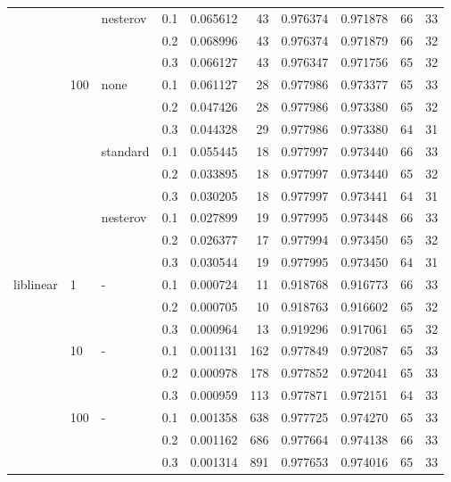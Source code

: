 \begin{table}[H]
\begin{tabular}{llllrrrrrr}
          &     & nesterov & 0.1 &  0.065612 &      43 &  0.976374 &  0.971878 &          66 &        33 \\
          &     &   & 0.2 &  0.068996 &      43 &  0.976374 &  0.971879 &          66 &        32 \\
          &     &   & 0.3 &  0.066127 &      43 &  0.976347 &  0.971756 &          65 &        32 \\
          & 100 & none & 0.1 &  0.061127 &      28 &  0.977986 &  0.973377 &          65 &        33 \\
          &     &   & 0.2 &  0.047426 &      28 &  0.977986 &  0.973380 &          65 &        32 \\
          &     &   & 0.3 &  0.044328 &      29 &  0.977986 &  0.973380 &          64 &        31 \\
          &     & standard & 0.1 &  0.055445 &      18 &  0.977997 &  0.973440 &          66 &        33 \\
          &     &   & 0.2 &  0.033895 &      18 &  0.977997 &  0.973440 &          65 &        32 \\
          &     &   & 0.3 &  0.030205 &      18 &  0.977997 &  0.973441 &          64 &        31 \\
          &     & nesterov & 0.1 &  0.027899 &      19 &  0.977995 &  0.973448 &          66 &        33 \\
          &     &   & 0.2 &  0.026377 &      17 &  0.977994 &  0.973450 &          65 &        32 \\
          &     &   & 0.3 &  0.030544 &      19 &  0.977995 &  0.973450 &          64 &        31 \\
liblinear & 1   & - & 0.1 &  0.000724 &      11 &  0.918768 &  0.916773 &          66 &        33 \\
          &     &   & 0.2 &  0.000705 &      10 &  0.918763 &  0.916602 &          65 &        32 \\
          &     &   & 0.3 &  0.000964 &      13 &  0.919296 &  0.917061 &          65 &        32 \\
          & 10  & - & 0.1 &  0.001131 &     162 &  0.977849 &  0.972087 &          65 &        33 \\
          &     &   & 0.2 &  0.000978 &     178 &  0.977852 &  0.972041 &          65 &        33 \\
          &     &   & 0.3 &  0.000959 &     113 &  0.977871 &  0.972151 &          64 &        33 \\
          & 100 & - & 0.1 &  0.001358 &     638 &  0.977725 &  0.974270 &          65 &        33 \\
          &     &   & 0.2 &  0.001162 &     686 &  0.977664 &  0.974138 &          66 &        33 \\
          &     &   & 0.3 &  0.001314 &     891 &  0.977653 &  0.974016 &          65 &        33 \\
\bottomrule
\end{tabular}
\end{table}
